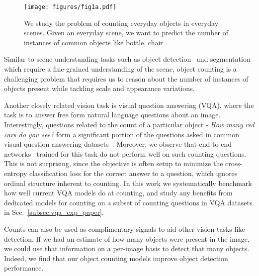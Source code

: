 \documentclass[10pt,twocolumn,letterpaper]{article}
\begin{document}
\begin{figure}[t]
\texttt{[image: figures/fig1a.pdf]}
\vspace{-15pt}
\caption{\footnotesize{We study the problem of counting everyday objects in everyday scenes. Given an everyday scene, we want to predict the number of instances of common objects like bottle, chair \etc.}}
\label{fig:1}
\vspace{-20pt}
\end{figure}

Similar to scene understanding tasks such as object detection~\cite{Viola2001,Felzenszwalb2008,Girshick2015FastR-CNN,Ren2015FasterNetworks,Gidaris2015ObjectModel,Wan2015End-to-EndSuppression,RedmonDGF15,SSD} and segmentation~\cite{Carreira2012,Long2015FullySegmentation,RenZ16} which require a fine-grained understanding of the scene, object counting is a challenging problem that requires us to reason about the number of instances of objects present while tackling scale and appearance variations.



Another closely related vision task is visual question answering (VQA), where the task is to answer free form natural language questions about an image. Interestingly, questions related to the count of a particular object - \emph{How many red cars do you see?} form a significant portion of the questions asked in common visual question answering datasets~\cite{vqa,Ren2015ExploringAnswering}. Moreover, we observe that end-to-end networks~\cite{vqa,Ren2015ExploringAnswering,Malinowski2015AskImages,FukuiPYRDR16} trained for this task do not perform well on such counting questions. This is not surprising, since the objective is often setup to minimize the cross-entropy classification loss for the correct answer to a question, which ignores ordinal structure inherent to counting. In this work we systematically benchmark how well current VQA models do at counting, and study any benefits from dedicated models for counting on a subset of counting questions in VQA datasets in Sec.~\ref{subsec:vqa_exp_paper}.


Counts can also be used as complimentary signals to aid other vision tasks like detection. If we had an estimate of how many objects were present in the image, we could use that information on a per-image basis to detect that many objects. Indeed, we find that our object counting models improve object detection performance.
\end{document}
